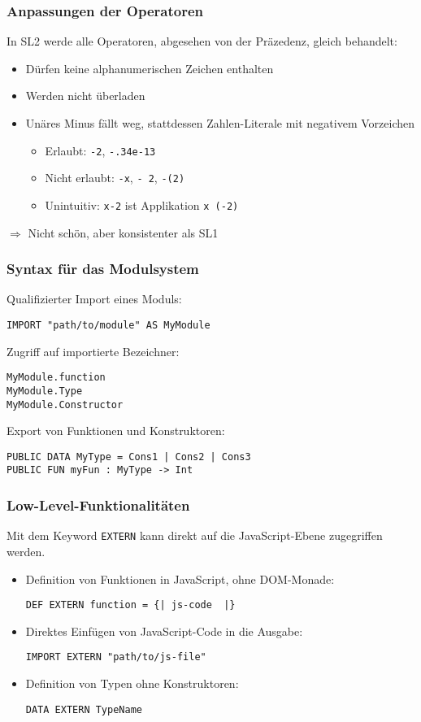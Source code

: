 \begin{frame}[containsverbatim=true]
\frametitle{Anpassungen der Operatoren}
In SL2 werde alle Operatoren, abgesehen von der 
Präzedenz, gleich behandelt:
\begin{itemize}
\item Dürfen keine alphanumerischen Zeichen enthalten
\item Werden nicht überladen
\item Unäres Minus fällt weg, stattdessen Zahlen-Literale 
  mit negativem Vorzeichen
  \begin{itemize}
    \item Erlaubt: \verb|-2|, \verb|-.34e-13|
    \item Nicht erlaubt: \verb|-x|, \verb|- 2|, \verb|-(2)|
    \item Unintuitiv: \verb|x-2| ist Applikation \verb|x (-2)|
  \end{itemize}
\end{itemize}
$\Rightarrow$ Nicht schön, aber konsistenter als SL1
\end{frame}

\begin{frame}[containsverbatim=true]
\frametitle{Syntax für das Modulsystem}
Qualifizierter Import eines Moduls:
\begin{lstlisting}
IMPORT "path/to/module" AS MyModule
\end{lstlisting}

Zugriff auf importierte Bezeichner:
\begin{lstlisting}
MyModule.function
MyModule.Type
MyModule.Constructor
\end{lstlisting}

Export von Funktionen und Konstruktoren:
\begin{lstlisting}
PUBLIC DATA MyType = Cons1 | Cons2 | Cons3
PUBLIC FUN myFun : MyType -> Int
\end{lstlisting}
\end{frame}

\begin{frame}[containsverbatim=true]
\frametitle{Low-Level-Funktionalitäten}
Mit dem Keyword \verb|EXTERN| kann direkt auf die
JavaScript-Ebene zugegriffen werden.

\begin{itemize}
\item
Definition von Funktionen in JavaScript,
ohne DOM-Monade:
\begin{lstlisting}
DEF EXTERN function = {| js-code  |}
\end{lstlisting}
\item
Direktes Einfügen von JavaScript-Code in die Ausgabe:
\begin{lstlisting}
IMPORT EXTERN "path/to/js-file"
\end{lstlisting}
\item
Definition von Typen ohne Konstruktoren:
\begin{lstlisting}
DATA EXTERN TypeName
\end{lstlisting}
\end{itemize}
\end{frame}

